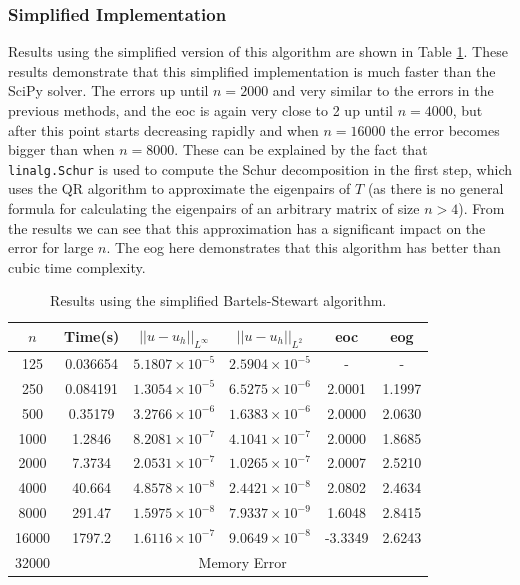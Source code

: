 \documentclass[11pt]{article}
\numberwithin{equation}{section}
\begin{document}
\subsubsection*{Simplified Implementation}

Results using the simplified version of this algorithm are shown in Table \ref{table:bartels simplified}. These results demonstrate that this simplified implementation is much faster than the SciPy solver. The errors up until $n=2000$ and very similar to the errors in the previous methods, and the eoc is again very close to 2 up until $n=4000$, but after this point starts decreasing rapidly and when $n=16000$ the error becomes bigger than when $n=8000$. These can be explained by the fact that \texttt{linalg.Schur} is used to compute the Schur decomposition in the first step, which uses the QR algorithm to approximate the eigenpairs of $T$ (as there is no general formula for calculating the eigenpairs of an arbitrary matrix of size $n>4$). From the results we can see that this approximation has a significant impact on the error for large $n$. The eog here demonstrates that this algorithm has better than cubic time complexity.
\begin{table}[H]
\centering
\begin{tabular}{|c|c|c|c|c|c|}
\hline
$n$ & Time(s) & $|| u - u_h ||_{L^{\infty}}$ &$|| u - u_h ||_{L^{2}}$ & eoc & eog \\
\hline
125 & 0.036654 & $5.1807 \times 10^{-5}$ & $2.5904 \times 10^{-5}$ & - & - \\
250 & 0.084191 & $1.3054 \times 10^{-5}$ & $6.5275 \times 10^{-6}$ & 2.0001 & 1.1997 \\
500 & 0.35179 & $3.2766 \times 10^{-6}$ & $1.6383 \times 10^{-6}$ & 2.0000 & 2.0630 \\
1000 & 1.2846 & $8.2081 \times 10^{-7}$ & $4.1041 \times 10^{-7}$ & 2.0000 & 1.8685 \\
2000 & 7.3734 & $2.0531 \times 10^{-7}$ & $1.0265 \times 10^{-7}$ & 2.0007 & 2.5210 \\
4000 & 40.664 & $4.8578 \times 10^{-8}$ & $2.4421 \times 10^{-8}$ & 2.0802 & 2.4634 \\
8000 & 291.47 & $1.5975 \times 10^{-8}$ & $7.9337 \times 10^{-9}$ & 1.6048 & 2.8415 \\
16000 & 1797.2 & $1.6116 \times 10^{-7}$ & $9.0649 \times 10^{-8}$ & -3.3349 & 2.6243 \\
\cline{2-6}
32000 & \multicolumn{5}{c|}{Memory Error} \\
\hline
\end{tabular}
\caption{Results using the simplified Bartels-Stewart algorithm.}
\label{table:bartels simplified}
\end{table}
\end{document}
